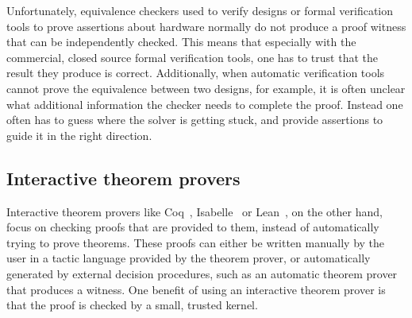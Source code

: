 Unfortunately, equivalence checkers used to verify designs or formal
verification tools to prove assertions about hardware normally do not produce a
proof witness that can be independently checked.  This means that especially
with the commercial, closed source formal verification tools, one has to trust
that the result they produce is correct.  Additionally, when automatic
verification tools cannot prove the equivalence between two designs, for
example, it is often unclear what additional information the checker needs to
complete the proof.  Instead one often has to guess where the solver is getting
stuck, and provide assertions to guide it in the right direction.

%

\subsection{Interactive theorem provers}%
\label{sec:bg:interactive-theorem-provers}

Interactive theorem provers like
Coq~\cite[]{bertot04_inter_theor_provin_progr_devel},
Isabelle~\cite[]{paulson94_i} or Lean~\cite[]{moura15_l}, on the other hand,
focus on checking proofs that are provided to them, instead of automatically
trying to prove theorems.  These proofs can either be written manually by the
user in a tactic language provided by the theorem prover, or automatically
generated by external decision procedures, such as an automatic theorem prover
that produces a witness.  One benefit of using an interactive theorem prover is
that the proof is checked by a small, trusted kernel.

